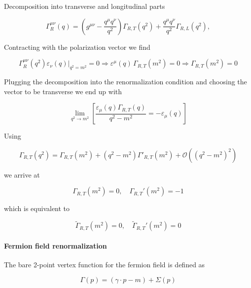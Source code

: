 \documentclass[../FeynCalcManual.tex]{subfiles}
\begin{document}
Decomposition into transverse and longitudinal parts

\begin{equation}
    \Gamma_R^{\mu \nu} (q) = \left ( g^{\mu \nu} - \frac{q^\mu q^\nu}{q^2} \right ) \Gamma_{R,T} (q^2) + \frac{q^\mu q^\nu}{q^2} \Gamma_{R,L} (q^2),
\end{equation}

Contracting with the polarization vector we find

\begin{equation}
     \Gamma_R^{\mu \nu} (q^2)  \varepsilon_\nu (q) \biggl |_{q^2=m^2}  = 0 \Rightarrow \varepsilon^\mu (q) \, \Gamma_{R,T} (m^2) = 0 \Rightarrow \Gamma_{R,T} (m^2) = 0
\end{equation}

Plugging the decomposition into the renormalization condition and
choosing the vector to be transverse we end up with

\begin{equation}
        \lim_{q^2 \to m^2} \left [ \frac{\varepsilon_{\mu}(q) \Gamma_{R,T} (q)}{q^2 -m ^2}  = - \varepsilon_{\mu}(q) \right ]
\end{equation}

Using

\begin{equation}
    \Gamma_{R,T} (q^2) =  \Gamma_{R,T} (m^2) + (q^2 - m^2) \Gamma'_{R,T} (m^2) + \mathcal{O}( (q^2 - m^2)^2)
\end{equation}

we arrive at

\begin{equation}
    \Gamma_{R,T}(m^2) = 0, \quad \Gamma_{R,T}'(m^2) = -1
\end{equation}

which is equivalent to

\begin{equation}
    \tilde{\Gamma}_{R,T}(m^2) = 0, \quad \tilde{\Gamma}_{R,T}'(m^2) = 0
\end{equation}

\paragraph{Fermion field
renormalization}\label{fermion-field-renormalization}

The bare 2-point vertex function for the fermion field is defined as

\begin{equation}
    \Gamma(p) = (\gamma \cdot p - m) + \Sigma(p)
\end{equation}
\end{document}
